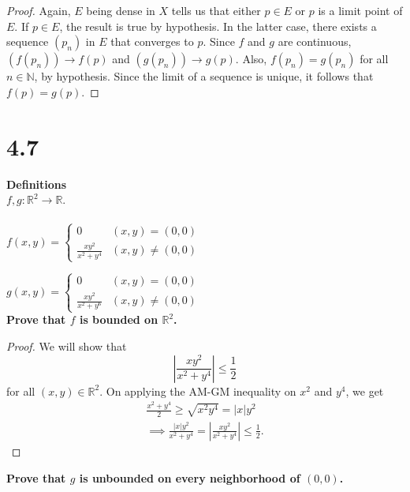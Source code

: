 \documentclass[12pt]{article}
\begin{document}
\begin{proof}
      Again, $E$ being dense in $X$ tells us that either $p\in E$ or $p$ is 
      a limit point of $E$. If $p\in E$, the result is true by hypothesis. 
      In the latter case, there exists a sequence $(p_{n})$ in $E$ that 
      converges to $p$. Since $f$ and $g$ are continuous, 
      $(f(p_{n}))\to f(p)$ and $(g(p_{n}))\to g(p)$. Also, 
      $f(p_{n})=g(p_{n})$ for all $n\in \mathbb{N}$, by hypothesis. 
      Since the limit of a sequence is unique, it follows that $f(p)=g(p)$.  
\end{proof}


\section{4.7}
{\bf Definitions}\\
$f, g:\mathbb{R}^{2}\to \mathbb{R}$.\\\\
$
f(x, y)=\begin{cases}
0 &  (x, y)=(0, 0)\\
\frac{xy^{2}}{x^{2}+y^{4}} & (x, y)\ne(0, 0)
\end{cases}
$

$
g(x, y)=\begin{cases}
0 &  (x, y)=(0, 0)\\
\frac{xy^{2}}{x^{2}+y^{6}} & (x, y)\ne(0, 0)
\end{cases}
$\\

{\bf 
Prove that $f$ is bounded on $\mathbb{R}^{2}$.}

\begin{proof}
      We will show that
$$
\left|\frac{xy^{2}}{x^{2}+y^{4}}\right|\leq \frac{1}{2}
$$
for all $(x, y)\in \mathbb{R}^{2}$. On applying the AM-GM inequality on $x^{2}$ and $y^{4}$, we get 
\begin{align*}
\frac{x^{2} +y^{4}}{2}\geq \sqrt{ x^{2}y^{4} }=|x|y^{2} \\
\implies \frac{|x|y^{2}}{x^{2}+y^{4}}=\left|\frac{xy^{2}}{x^{2}+y^{4}}\right|\leq \frac{1}{2}.
\end{align*}
\end{proof}

{\bf 
Prove that $g$ is unbounded on every neighborhood of $(0, 0)$.}
\end{document}
